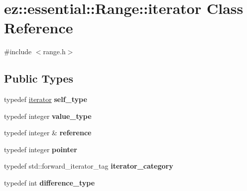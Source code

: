 \hypertarget{classez_1_1essential_1_1Range_1_1iterator}{}\section{ez\+:\+:essential\+:\+:Range\+:\+:iterator Class Reference}
\label{classez_1_1essential_1_1Range_1_1iterator}


{\ttfamily \#include $<$range.\+h$>$}

\subsection*{Public Types}
\begin{DoxyCompactItemize}
\item 
\mbox{\label{classez_1_1essential_1_1Range_1_1iterator_a713bdf44d4b985f87e10dffe035541fd}} 
typedef \hyperlink{classez_1_1essential_1_1Range_1_1iterator}{iterator} {\bfseries self\+\_\+type}
\item 
\mbox{\label{classez_1_1essential_1_1Range_1_1iterator_abb176db665ef7ba9a38d95d2bc044022}} 
typedef integer {\bfseries value\+\_\+type}
\item 
\mbox{\label{classez_1_1essential_1_1Range_1_1iterator_aa10a860a661f89117b0801607b91450e}} 
typedef integer \& {\bfseries reference}
\item 
\mbox{\label{classez_1_1essential_1_1Range_1_1iterator_aa45fb2492e39ce4f9e2c1b13ff04704e}} 
typedef integer {\bfseries pointer}
\item 
\mbox{\label{classez_1_1essential_1_1Range_1_1iterator_abc9e68ae81132580f9091febf2ec5395}} 
typedef std\+::forward\+\_\+iterator\+\_\+tag {\bfseries iterator\+\_\+category}
\item 
\mbox{\label{classez_1_1essential_1_1Range_1_1iterator_a7b590b7ff09b70ca5fac6da60c72ab28}} 
typedef int {\bfseries difference\+\_\+type}
\end{DoxyCompactItemize}
